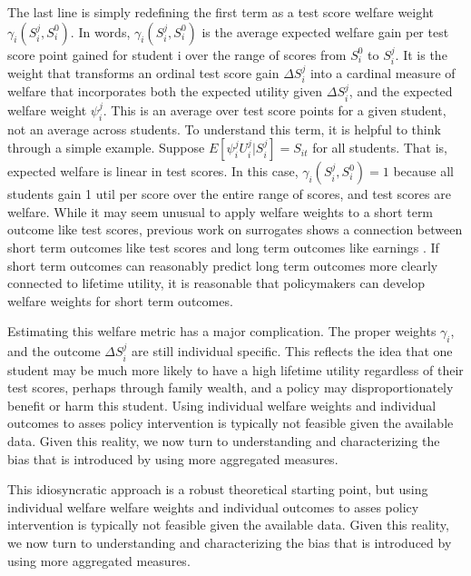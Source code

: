 \documentclass[12pt]{article}
\theoremstyle{definition}
\theoremstyle{definition}
\theoremstyle{definition}
\theoremstyle{definition}
\begin{document}
     The last line is simply redefining the first term as a test score welfare weight $\gamma_i(S_i^j, S_i^0)$. In words, $\gamma_i(S_i^j, S_i^0)$  is the average expected welfare gain per test score point gained for student i over the range of scores from $S_i^0$ to $S_i^j$. It is the weight that transforms an ordinal test score gain $\Delta S^j_i$ into a cardinal measure of welfare that incorporates both the expected utility given $\Delta S^j_i$, and the expected welfare weight $\psi^j_i$. This is an average over test score points for a given student, not an average across students. To understand this term, it is helpful to think through a simple example. Suppose  $ E[\psi^j_i U^j_i |S_i^j] = S_{it}$ for all students. That is, expected welfare is linear in test scores. In this case,  $\gamma_i(S_i^j, S_i^0) = 1$ because all students gain 1 util per score over the entire range of scores, and test scores are welfare. While it may seem unusual to apply welfare weights to a short term outcome like test scores, previous work on surrogates shows a connection between short term outcomes like test scores and long term outcomes like earnings \citep{athey2019surrogate}. If short term outcomes can reasonably predict long term outcomes more clearly connected to lifetime utility, it is reasonable that policymakers can develop welfare weights for short term outcomes. 

     Estimating this welfare metric has a major complication. The proper weights  $\gamma_i$, and the outcome $\Delta S^j_i$ are still individual specific. This reflects the idea that one student may be much more likely to have a high lifetime utility regardless of their test scores, perhaps through family wealth, and a policy may disproportionately benefit or harm this student. Using individual welfare weights and individual outcomes to asses policy intervention is typically not feasible given the available data. Given this reality, we now turn to understanding and characterizing the bias that is introduced by using more aggregated measures. 

     
     This idiosyncratic approach is a robust theoretical starting point, but using individual welfare welfare weights and individual outcomes to asses policy intervention is typically not feasible given the available data. Given this reality, we now turn to understanding and characterizing the bias that is introduced by using more aggregated measures. 
    
\end{document}
